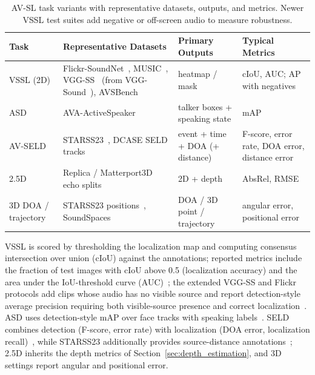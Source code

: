 \begin{table}[!ht]
\centering
\caption{AV-SL task variants with representative datasets, outputs, and metrics. Newer VSSL test suites add negative or off-screen audio to measure robustness.}
\label{tab:p3_s6_5_1_avsl_tasks}
\small
\begin{tabular}{@{}L{0.12\textwidth} L{0.34\textwidth} L{0.20\textwidth} L{0.24\textwidth}@{}}
\toprule
\textbf{Task} & \textbf{Representative Datasets} & \textbf{Primary Outputs} & \textbf{Typical Metrics} \\
\midrule
VSSL (2D) & Flickr-SoundNet~\cite{senocak2018learning}, MUSIC~\cite{zhao2018sound}, VGG-SS~\cite{chen2021localizing} (from VGG-Sound~\cite{chen2020vggsound}), AVSBench~\cite{zhou2022avs} & heatmap / mask & cIoU, AUC; AP with negatives \\
ASD & AVA-ActiveSpeaker~\cite{roth2020ava} & talker boxes + speaking state & mAP \\
AV-SELD & STARSS23~\cite{politis2023dataset}, DCASE SELD tracks~\cite{politis2020overview} & event + time + DOA (+ distance) & F-score, error rate, DOA error, distance error \\
2.5D & Replica / Matterport3D echo splits~\cite{gao2020visualechoes} & 2D + depth & AbsRel, RMSE \\
3D DOA / trajectory & STARSS23 positions~\cite{politis2023dataset}, SoundSpaces~\cite{chen2020soundspaces} & DOA / 3D point / trajectory & angular error, positional error \\
\bottomrule
\end{tabular}
\end{table}

VSSL is scored by thresholding the localization map and computing consensus intersection over union (cIoU) against the annotations; reported metrics include the fraction of test images with cIoU above 0.5 (localization accuracy) and the area under the IoU-threshold curve (AUC)~\cite{senocak2018learning}; the extended VGG-SS and Flickr protocols add clips whose audio has no visible source and report detection-style average precision requiring both visible-source presence and correct localization~\cite{chen2021localizing,mo2022closer}. ASD uses detection-style mAP over face tracks with speaking labels~\cite{roth2020ava}. SELD combines detection (F-score, error rate) with localization (DOA error, localization recall)~\cite{politis2020overview}, while STARSS23 additionally provides source-distance annotations~\cite{politis2023dataset}; 2.5D inherits the depth metrics of Section~\ref{sec:depth_estimation}, and 3D settings report angular and positional error.

